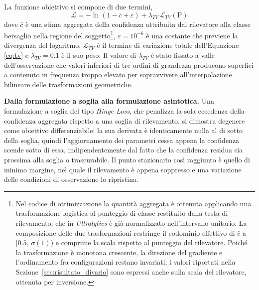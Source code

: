\documentclass[a4paper,12pt]{report}
\begin{document}
La funzione obiettivo si compone di due termini,
\begin{equation}
    \mathcal{L} = -\ln\left(1 - \bar{c} + \varepsilon\right)
    + \lambda_{TV} \, \mathcal{L}_{TV}(\mathrm{P})
    \label{eq:loss_totale}
\end{equation}
dove $\bar{c}$ è una stima aggregata della confidenza attribuita dal
rilevatore alla classe bersaglio nella regione del soggetto\footnote{Nel codice
di ottimizzazione la quantità aggregata è ottenuta applicando una
trasformazione logistica al punteggio di classe restituito dalla testa di
rilevamento, che in \textit{Ultralytics} è già normalizzato nell'intervallo
unitario. La composizione delle due trasformazioni restringe il codominio
effettivo di $\bar{c}$ a $[0.5,\,\sigma(1))$ e comprime la scala rispetto al
punteggio del rilevatore. Poiché la trasformazione è monotona crescente, la
direzione del gradiente e l'ordinamento fra configurazioni restano invariati; i
valori riportati nella Sezione~\ref{sec:risultato_divario} sono espressi anche
sulla scala del rilevatore, ottenuta per inversione.}, $\varepsilon =
10^{-6}$ è una costante che previene la divergenza del logaritmo,
$\mathcal{L}_{TV}$ è il termine di variazione totale dell'Equazione \ref{eq:tv}
e $\lambda_{TV} = 0.1$ è il suo peso. Il valore di $\lambda_{TV}$ è stato
fissato a valle dell'osservazione che valori inferiori di tre ordini di
grandezza producono superfici a contenuto in frequenza troppo elevato per
sopravvivere all'interpolazione bilineare delle trasformazioni geometriche.

\textbf{Dalla formulazione a soglia alla formulazione asintotica.}
\label{sec:loss_asintotica}
Una formulazione a soglia del tipo \textit{Hinge Loss}, che penalizza la sola
eccedenza della confidenza aggregata rispetto a una soglia di rilevamento, si
dimostra degenere come obiettivo differenziabile: la sua derivata è
identicamente nulla al di sotto della soglia, quindi l'aggiornamento dei
parametri cessa appena la confidenza scende sotto di essa, indipendentemente dal
fatto che la confidenza residua sia prossima alla soglia o trascurabile. Il
punto stazionario così raggiunto è quello di minimo margine, nel quale il
rilevamento è appena soppresso e una variazione delle condizioni di osservazione
lo ripristina.
\end{document}
